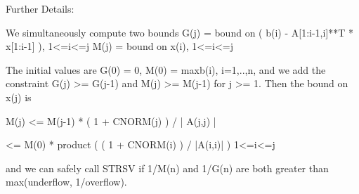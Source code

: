 \begin{DoxyParagraph}{Further Details\+: }
\begin{DoxyVerb}
  We simultaneously compute two bounds
       G(j) = bound on ( b(i) - A[1:i-1,i]**T * x[1:i-1] ), 1<=i<=j
       M(j) = bound on x(i), 1<=i<=j

  The initial values are G(0) = 0, M(0) = max{b(i), i=1,..,n}, and we
  add the constraint G(j) >= G(j-1) and M(j) >= M(j-1) for j >= 1.
  Then the bound on x(j) is

       M(j) <= M(j-1) * ( 1 + CNORM(j) ) / | A(j,j) |

            <= M(0) * product ( ( 1 + CNORM(i) ) / |A(i,i)| )
                      1<=i<=j

  and we can safely call STRSV if 1/M(n) and 1/G(n) are both greater
  than max(underflow, 1/overflow).\end{DoxyVerb}
 
\end{DoxyParagraph}
